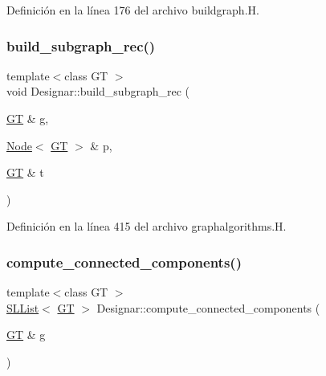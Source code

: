 Definición en la línea 176 del archivo buildgraph.\+H.

\mbox{\label{namespace_designar_a035e48f6f48994ed7b1fd8c6d7f3ec32}} 
\subsubsection{\texorpdfstring{build\+\_\+subgraph\+\_\+rec()}{build\_subgraph\_rec()}}
{\footnotesize\ttfamily template$<$class GT $>$ \\
void Designar\+::build\+\_\+subgraph\+\_\+rec (\begin{DoxyParamCaption}\item[{\hyperlink{demo-buildgraph_8_c_a3001c40d2c31ca87ed96cd7d1334a55e}{GT} \&}]{g,  }\item[{\hyperlink{namespace_designar_a5af326c65aa2bd26b26c410f2030d09e}{Node}$<$ \hyperlink{demo-buildgraph_8_c_a3001c40d2c31ca87ed96cd7d1334a55e}{GT} $>$ \&}]{p,  }\item[{\hyperlink{demo-buildgraph_8_c_a3001c40d2c31ca87ed96cd7d1334a55e}{GT} \&}]{t }\end{DoxyParamCaption})}



Definición en la línea 415 del archivo graphalgorithms.\+H.

\mbox{\label{namespace_designar_a1f5287eee752172e2db8bd4cd148f93b}} 
\subsubsection{\texorpdfstring{compute\+\_\+connected\+\_\+components()}{compute\_connected\_components()}}
{\footnotesize\ttfamily template$<$class GT $>$ \\
\hyperlink{class_designar_1_1_s_l_list}{S\+L\+List}$<$ \hyperlink{demo-buildgraph_8_c_a3001c40d2c31ca87ed96cd7d1334a55e}{GT} $>$ Designar\+::compute\+\_\+connected\+\_\+components (\begin{DoxyParamCaption}\item[{\hyperlink{demo-buildgraph_8_c_a3001c40d2c31ca87ed96cd7d1334a55e}{GT} \&}]{g }\end{DoxyParamCaption})}



